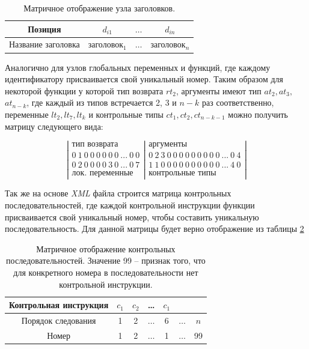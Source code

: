 \begin{table}[h]
	\begin{center}
		\caption{Матричное отображение узла заголовков.}
		\label{tab:headers}
		\begin{tabular}{|c|c|c|c|}
			\hline
			\bfseries Позиция & $d_{i1}$ & $\dots$ & $d_{in}$ \\
			\hline
			Название заголовка & заголовок$_1$ & $\dots$ & заголовок$_{n}$\\ \hline
		\end{tabular}
	\end{center}
\end{table}

Аналогично для узлов глобальных переменных и функций, где каждому идентификатору присваивается свой уникальный номер. Таким образом для некоторой функции у которой тип возврата $rt_2$, аргументы имеют тип $at_2,at_3,$ $at_{n-k}$, где каждый из типов встречается 2, 3 и $n-k$ раз соответственно, переменные $lt_2,lt_7,lt_k$ и контрольные типы $ct_1,ct_2,ct_{n-k-1}$ можно получить матрицу следующего вида:

\[ \left| 
\begin{array}{c}
	\text{тип возврата}\\
	0~1 ~0~ 0~ 0~ 0~ 0~ 0~ ... ~0~ 0 \\
	0~ 2~ 0~ 0~ 0~ 0~ 3~ 0~ ...~ 0~ 7 \\
	\text{лок. переменные}
\end{array} \right|
\left.\begin{array}{c}
	\text{аргументы}\\
	0~2 ~3~ 0~ 0~ 0~ 0~ 0~0~0~0~0~ ... ~0~ 4 \\
	1~1 ~0~ 0~ 0~ 0~ 0~ 0~0~0~0~0~ ...~ 4~ 0 \\
	\text{контрольные типы}
\end{array}\right|
\] 


Так же на основе \textit{XML} файла строится матрица контрольных последовательностей, где каждой контрольной инструкции функции присваивается свой уникальный номер, чтобы составить уникальную последовательность. Для данной матрицы будет верно отображение из таблицы \ref{tab:control-sequence}

\begin{table}[h]
	\begin{center}
		\caption{Матричное отображение контрольных последовательностей. Значение 99 -- признак того, что для конкретного номера в последовательности нет контрольной инструкции.}
		\label{tab:control-sequence}
		\begin{tabular}{|c|c|c|c|c|c|c|}
			\hline
			\bfseries Контрольная инструкция & $c_1$ & $c_2$ &\dots &$c_1$ & &  \\
			\hline
			Порядок следования & 1 & 2 & $\dots$ & 6 &$\dots$ &$n$ \\ \hline
			Номер & 1 & 2& $\dots$ &1 & $\dots$ & 99\\ \hline
		\end{tabular}
	\end{center}
\end{table}


